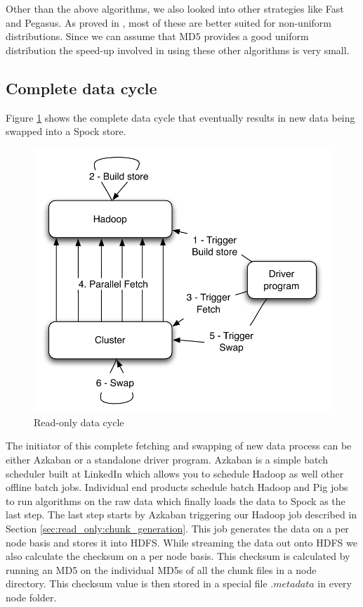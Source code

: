 \documentclass[twocolumn]{article}
\newcommand{\projectname}{Spock}
\begin{document}
Other than the above algorithms, we also looked into other strategies like Fast and Pegasus. As proved in \cite{manolopoulos}, most of these are better suited for non-uniform distributions. Since we can assume that MD5 provides a good uniform distribution the speed-up involved in using these other algorithms is very small. 


\subsection{Complete data cycle}
\label{sec:read_only:data_cycle}

Figure \ref{cycle} shows the complete data cycle that eventually results in new data being swapped into a \projectname{} store. 

\begin{figure}
  \centering
    \includegraphics[scale=0.60]{images/cycle.pdf}
  \caption{Read-only data cycle}
  \label{cycle}
\end{figure}

The initiator of this complete fetching and swapping of new data process can be either Azkaban or a standalone driver program. Azkaban\cite{azkaban} is a simple batch scheduler built at LinkedIn which allows you to schedule Hadoop as well other offline batch jobs. Individual end products schedule batch Hadoop and Pig jobs to run algorithms on the raw data which finally loads the data to \projectname{} as the last step. The last step starts by Azkaban triggering our Hadoop job described in Section \ref{sec:read_only:chunk_generation}. This job generates the data on a per node basis and stores it into HDFS. While streaming the data out onto HDFS we also calculate the checksum on a per node basis. This checksum is calculated by running an MD5 on the individual MD5s of all the chunk files in a node directory. This checksum value is then stored in a special file $.metadata$ in every node folder. 
\end{document}
